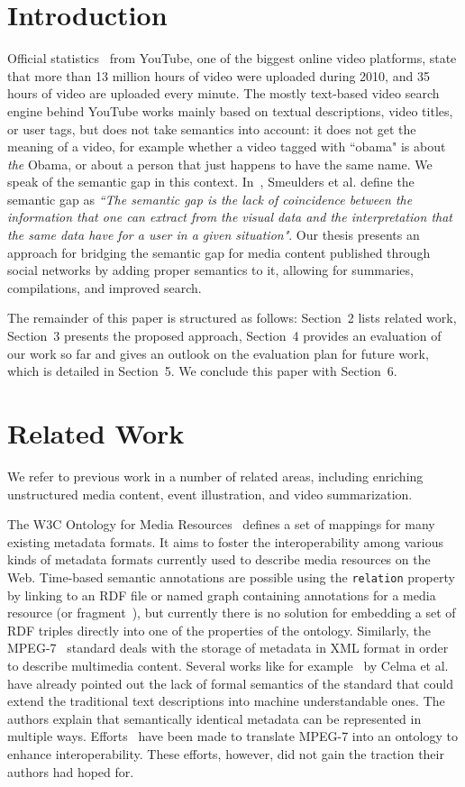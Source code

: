 \documentclass[runningheads,a4paper]{llncs}
\begin{document}
\section{Introduction}
Official statistics~\cite{youtube:stats} from YouTube, one of the biggest online video platforms, state that more than 13 million hours of video were uploaded during 2010, and 35 hours of video are uploaded every minute. The mostly text-based video search engine behind YouTube works mainly based on textual descriptions, video titles, or user tags, but does not take semantics into account: it does not get the meaning of a video, for example whether a video tagged with ``obama" is about \textit{the} Obama, or about a person that just happens to have the same name. We speak of the semantic gap in this context. In~\cite{Smeulders}, Smeulders et al. define the semantic gap as \textit{``The semantic gap is the lack of coincidence between the information that one can extract from the visual data and the interpretation that the same data have for a user in a given situation"}. Our thesis presents an approach for bridging the semantic gap for media content published through social networks by adding proper semantics to it, allowing for summaries, compilations, and improved search. 

The remainder of this paper is structured as follows: Section~2 lists related work, Section~3 presents the proposed approach, Section~4 provides an evaluation of our work so far and gives an outlook on the evaluation plan for future work, which is detailed in Section~5. We conclude this paper with Section~6.

\section{Related Work}
We refer to previous work in a number of related areas, including enriching unstructured media content, event illustration, and video summarization.

The W3C Ontology for Media Resources~\cite{mediaontology} defines a set of mappings for many existing metadata formats. It aims to foster the interoperability among various kinds of metadata formats currently used to describe media resources on the Web. Time-based semantic annotations are possible using the \texttt{relation} property by linking to an RDF file or named graph containing annotations for a media resource (or fragment~\cite{W3C:MediaFrags}), but currently there is no solution for embedding a set of RDF triples directly into one of the properties of the ontology. Similarly, the MPEG-7~\cite{mpeg7} standard deals with the storage of metadata in XML format in order to describe multimedia content. Several works like for example~\cite{Celma2007} by Celma et al. have already pointed out the lack of formal semantics of the standard that could extend the traditional text descriptions into machine understandable ones. The authors explain that semantically identical metadata can be represented in multiple ways. Efforts~\cite{garca_semantic_2005-1} have been made to translate MPEG-7 into an ontology to enhance interoperability. These efforts, however, did not gain the traction their authors had hoped for.
\end{document}
